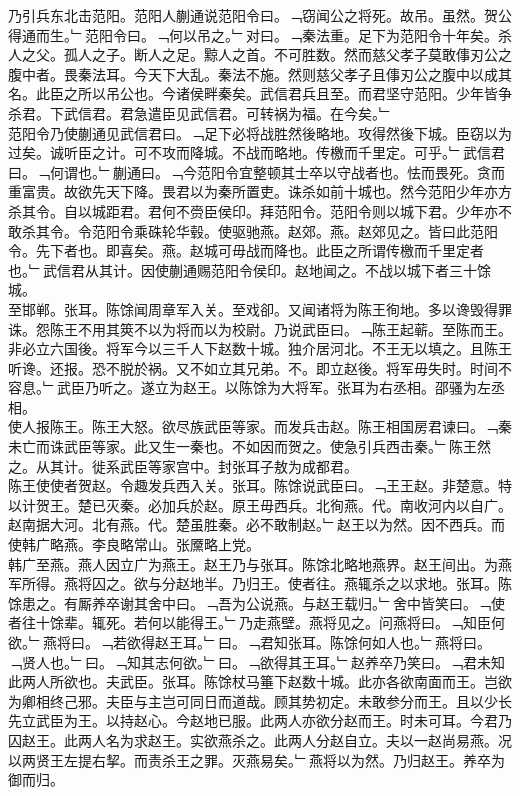 \documentclass{zhvt-classic}
\begin{document}
\hspace*{2em}乃引兵东北击范阳。范阳人蒯通说范阳令曰。﹁窃闻公之将死。故吊。虽然。贺公得通而生。﹂范阳令曰。﹁何以吊之。﹂对曰。﹁秦法重。足下为范阳令十年矣。杀人之父。孤人之子。断人之足。黥人之首。不可胜数。然而慈父孝子莫敢倳刃公之腹中者。畏秦法耳。今天下大乱。秦法不施。然则慈父孝子且倳刃公之腹中以成其名。此臣之所以吊公也。今诸侯畔秦矣。武信君兵且至。而君坚守范阳。少年皆争杀君。下武信君。君急遣臣见武信君。可转祸为福。在今矣。﹂\\
\hspace*{2em}范阳令乃使蒯通见武信君曰。﹁足下必将战胜然後略地。攻得然後下城。臣窃以为过矣。诚听臣之计。可不攻而降城。不战而略地。传檄而千里定。可乎。﹂武信君曰。﹁何谓也。﹂蒯通曰。﹁今范阳令宜整顿其士卒以守战者也。怯而畏死。贪而重富贵。故欲先天下降。畏君以为秦所置吏。诛杀如前十城也。然今范阳少年亦方杀其令。自以城距君。君何不赍臣侯印。拜范阳令。范阳令则以城下君。少年亦不敢杀其令。令范阳令乘硃轮华毂。使驱驰燕。赵郊。燕。赵郊见之。皆曰此范阳令。先下者也。即喜矣。燕。赵城可毋战而降也。此臣之所谓传檄而千里定者也。﹂武信君从其计。因使蒯通赐范阳令侯印。赵地闻之。不战以城下者三十馀城。\\
\hspace*{2em}至邯郸。张耳。陈馀闻周章军入关。至戏卻。又闻诸将为陈王徇地。多以谗毁得罪诛。怨陈王不用其筴不以为将而以为校尉。乃说武臣曰。﹁陈王起蕲。至陈而王。非必立六国後。将军今以三千人下赵数十城。独介居河北。不王无以填之。且陈王听谗。还报。恐不脱於祸。又不如立其兄弟。不。即立赵後。将军毋失时。时间不容息。﹂武臣乃听之。遂立为赵王。以陈馀为大将军。张耳为右丞相。邵骚为左丞相。\\
\hspace*{2em}使人报陈王。陈王大怒。欲尽族武臣等家。而发兵击赵。陈王相国房君谏曰。﹁秦未亡而诛武臣等家。此又生一秦也。不如因而贺之。使急引兵西击秦。﹂陈王然之。从其计。徙系武臣等家宫中。封张耳子敖为成都君。\\
\hspace*{2em}陈王使使者贺赵。令趣发兵西入关。张耳。陈馀说武臣曰。﹁王王赵。非楚意。特以计贺王。楚已灭秦。必加兵於赵。原王毋西兵。北徇燕。代。南收河内以自广。赵南据大河。北有燕。代。楚虽胜秦。必不敢制赵。﹂赵王以为然。因不西兵。而使韩广略燕。李良略常山。张黡略上党。\\
\hspace*{2em}韩广至燕。燕人因立广为燕王。赵王乃与张耳。陈馀北略地燕界。赵王间出。为燕军所得。燕将囚之。欲与分赵地半。乃归王。使者往。燕辄杀之以求地。张耳。陈馀患之。有厮养卒谢其舍中曰。﹁吾为公说燕。与赵王载归。﹂舍中皆笑曰。﹁使者往十馀辈。辄死。若何以能得王。﹂乃走燕壁。燕将见之。问燕将曰。﹁知臣何欲。﹂燕将曰。﹁若欲得赵王耳。﹂曰。﹁君知张耳。陈馀何如人也。﹂燕将曰。﹁贤人也。﹂曰。﹁知其志何欲。﹂曰。﹁欲得其王耳。﹂赵养卒乃笑曰。﹁君未知此两人所欲也。夫武臣。张耳。陈馀杖马箠下赵数十城。此亦各欲南面而王。岂欲为卿相终己邪。夫臣与主岂可同日而道哉。顾其势初定。未敢参分而王。且以少长先立武臣为王。以持赵心。今赵地已服。此两人亦欲分赵而王。时未可耳。今君乃囚赵王。此两人名为求赵王。实欲燕杀之。此两人分赵自立。夫以一赵尚易燕。况以两贤王左提右挈。而责杀王之罪。灭燕易矣。﹂燕将以为然。乃归赵王。养卒为御而归。\\
\end{document}

